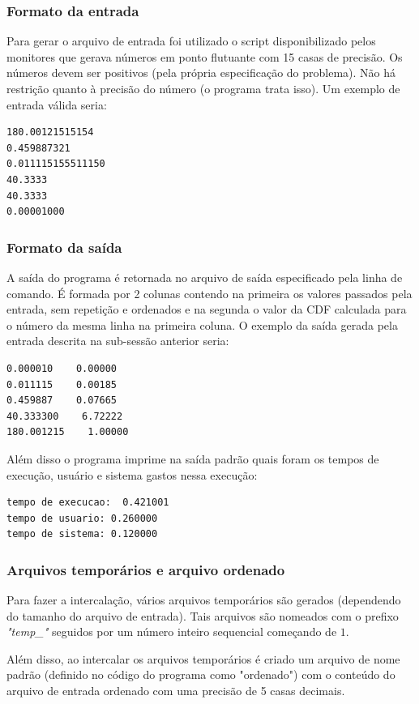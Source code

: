 \documentclass[12pt]{article}
\begin{document}
\subsubsection{Formato da entrada}
Para gerar o arquivo de entrada foi utilizado o script disponibilizado pelos monitores que 
gerava números em ponto flutuante com 15 casas de precisão. Os números devem ser positivos 
(pela própria especificação do problema). Não há restrição quanto à  precisão do número (o 
programa trata isso). Um exemplo de entrada válida seria:
\begin{verbatim}
180.00121515154
0.459887321
0.011115155511150
40.3333
40.3333
0.00001000
\end{verbatim}

\subsubsection{Formato da saída}
A saída do programa é retornada no arquivo de saída especificado pela linha de comando.
É formada por 2 colunas contendo na primeira os valores passados pela entrada, sem repetição
e ordenados e na segunda o valor da CDF calculada para o número da mesma linha na primeira 
coluna. O exemplo da saída gerada pela entrada descrita na sub-sessão anterior seria:
\begin{verbatim}
0.000010    0.00000
0.011115    0.00185
0.459887    0.07665
40.333300    6.72222
180.001215    1.00000
\end{verbatim}

Além disso o programa imprime na saída padrão quais foram os tempos de execução, usuário e sistema
gastos nessa execução:
\begin{verbatim}
tempo de execucao:  0.421001
tempo de usuario: 0.260000
tempo de sistema: 0.120000
\end{verbatim}

\subsubsection{Arquivos temporários e arquivo ordenado}
Para fazer a intercalação, vários arquivos temporários são gerados (dependendo do tamanho do arquivo
de entrada). Tais arquivos são nomeados com o prefixo \textit{"temp\_"} seguidos por um número inteiro
sequencial começando de $1$.

Além disso, ao intercalar os arquivos temporários é criado um arquivo de nome padrão (definido no código
do programa como "ordenado") com o conteúdo do arquivo de entrada ordenado com uma precisão de 5 casas decimais.
\end{document}
